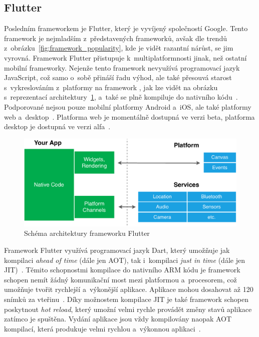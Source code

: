 \subsection{Flutter}

Posledním frameworkem je Flutter,
který je vyvíjený společností Google.
Tento framework je nejmladším z~představených frameworků,
avšak dle trendů z~obrázku~\ref{fig:framework_popularity},
kde je vidět razantní nárůst,
se jim vyrovná.
Framework Flutter přistupuje k~multiplatformnosti jinak,
než ostatní mobilní frameworky.
Nejenže tento framework nevyužívá programovací jazyk JavaScript,
což samo o~sobě přináší řadu výhod,
ale také přesouvá starost s~vykreslováním z~platformy na framework
\cite{hackernoon_flutter},
jak lze vidět na obrázku s~reprezentací
architektury~\ref{fig:framework_flutter},
a~také se plně kompiluje do nativního
kódu~\cite{dashmagazine_mobile_frameworks}.
Podporované nejsou pouze mobilní platformy Android a~iOS,
ale také platformy web a~desktop~\cite{flutter}.
Platforma web je momentálně dostupná ve verzi beta,
platforma desktop je dostupná ve verzi alfa~\cite{flutter_web, flutter_desktop}.

\begin{figure}
    \centering
    \includegraphics[width=\linewidth]{assets/technology-research/framework/flutter.pdf}
    \caption{Schéma architektury frameworku Flutter~\cite{hackernoon_flutter}}
    \label{fig:framework_flutter}
\end{figure}

Framework Flutter využívá programovací jazyk Dart,
který umožňuje jak kompilaci \emph{ahead of time} (dále jen AOT),
tak i~kompilaci \emph{just in time} (dále jen JIT)~\cite{hackernoon_flutter}.
Těmito schopnostmi kompilace do nativního ARM kódu je framework schopen
nemít žádný komunikační most mezi platformou a~procesorem,
což umožňuje tvořit rychlejší
a~výkonější aplikace.
Aplikace mohou dosahovat až 120 snímků
za vteřinu~\cite{dashmagazine_mobile_frameworks}.
Díky možnostem kompilace JIT je také framework schopen poskytnout
\emph{hot reload},
který umožní velmi rychle provádět změny stavů aplikace zatímco
je spuštěna.
Vydání aplikace jsou vždy kompilovány naopak AOT kompilací,
která produkuje velmi rychlou a~výkonnou aplikaci~\cite{hackernoon_flutter}.

